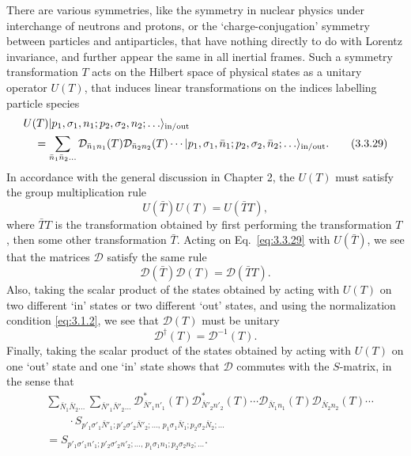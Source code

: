 There are various symmetries, like the symmetry in nuclear physics under
interchange of neutrons and protons, or the `charge-conjugation' symmetry between
particles and antiparticles, that have nothing directly to do with Lorentz
invariance, and further appear the same in all inertial frames. Such a symmetry
transformation $T$ acts on the Hilbert space of physical states as a unitary
operator $U(T)$, that induces linear transformations on the indices labelling
particle species
\begin{align}
&U(T)\lvert p_1,\sigma_1,n_1;p_2,\sigma_2,n_2;\ldots\rangle_{\mathrm{in/out}}
\nonumber\\
&\quad=\sum_{\bar n_1\bar n_2\ldots}
\mathcal{D}_{\bar n_1n_1}(T)\mathcal{D}_{\bar n_2n_2}(T)\cdots
\lvert p_1,\sigma_1,\bar n_1;p_2,\sigma_2,\bar n_2;\ldots\rangle_{\mathrm{in/out}}.
\tag{3.3.29}\label{eq:3.3.29}
\end{align}
In accordance with the general discussion in Chapter 2, the $U(T)$ must satisfy
the group multiplication rule
\begin{equation}
U(\bar T)U(T)=U(\bar TT),
\tag{3.3.30}\label{eq:3.3.30}
\end{equation}
where $\bar TT$ is the transformation obtained by first performing the
transformation $T$, then some other transformation $\bar T$. Acting on
Eq.~\eqref{eq:3.3.29} with $U(\bar T)$, we see that the matrices $\mathcal{D}$ satisfy the
same rule
\begin{equation}
\mathcal{D}(\bar T)\mathcal{D}(T)=\mathcal{D}(\bar TT).
\tag{3.3.31}\label{eq:3.3.31}
\end{equation}
Also, taking the scalar product of the states obtained by acting with $U(T)$ on
two different `in' states or two different `out' states, and using the
normalization condition \eqref{eq:3.1.2}, we see that $\mathcal{D}(T)$ must be unitary
\begin{equation}
\mathcal{D}^\dagger(T)=\mathcal{D}^{-1}(T).
\tag{3.3.32}\label{eq:3.3.32}
\end{equation}
Finally, taking the scalar product of the states obtained by acting with $U(T)$
on one `out' state and one `in' state shows that $\mathcal{D}$ commutes with the
$S$-matrix, in the sense that
\begin{align}
&\sum_{\bar N_1\bar N_2\ldots}
\sum_{\bar N'_1\bar N'_2\ldots}
\mathcal{D}^*_{\bar N'_1n'_1}(T)\mathcal{D}^*_{\bar N'_2n'_2}(T)\cdots
\mathcal{D}_{\bar N_1n_1}(T)\mathcal{D}_{\bar N_2n_2}(T)\cdots
\nonumber\\
&\qquad\cdot
S_{p'_1\sigma'_1\bar N'_1;p'_2\sigma'_2\bar N'_2;\ldots,\,
p_1\sigma_1\bar N_1;p_2\sigma_2\bar N_2;\ldots}
\nonumber\\
&=S_{p'_1\sigma'_1n'_1;p'_2\sigma'_2n'_2;\ldots,\,
p_1\sigma_1n_1;p_2\sigma_2n_2;\ldots}.
\tag{3.3.33}\label{eq:3.3.33}
\end{align}

